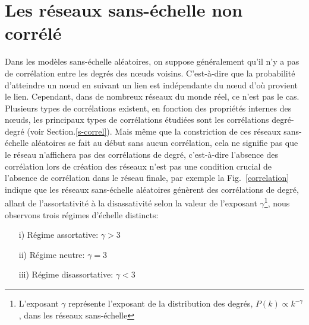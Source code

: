 \section{Les réseaux sans-échelle non corrélé}
Dans les modèles sans-échelle aléatoires, on suppose généralement qu'il n'y a pas de corrélation entre les degrés des nœuds voisins. C'est-à-dire que la probabilité d'atteindre un nœud en suivant un lien est indépendante du nœud d'où provient le lien. Cependant, dans de nombreux réseaux du monde réel, ce n'est pas le cas. Plusieurs types de corrélations existent, en fonction des propriétés internes des nœuds, les principaux types de corrélations étudiées sont les corrélations degré-degré (voir Section.\ref{s-correl}). Mais même que la constriction de ces réseaux sans-échelle aléatoires se fait au début sans aucun corrélation, cela ne signifie pas que le réseau n'affichera pas des corrélations de degré, c'est-à-dire l'absence des corrélation lors de création des réseaux n'est pas une condition crucial de l'absence de corrélation dans le réseau finale, par exemple la Fig.~\ref{correlation} indique que les réseaux sans-échelle aléatoires génèrent des corrélations de degré, allant de l'assortativité à la disassativité selon la valeur de l'exposant $\gamma$\footnote{L'exposant $\gamma$ représente l'exposant de la distribution des degrés, $P(k)\propto k^{-\gamma}$, dans les réseaux sans-échelle }, nous observons trois régimes d'échelle distincts:
\begin{itemize}
	\item[i)] Régime assortative: $\gamma>3$
	\item[ii)]Régime neutre: $\gamma=3$
	\item[iii)] Régime disassortative: $\gamma<3$
\end{itemize}

